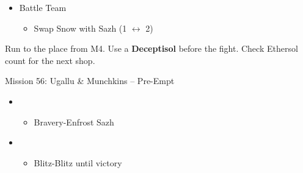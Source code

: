 \begin{menu}
	\begin{itemize}
	\paradigm
		\begin{itemize}
			\item Battle Team
				\begin{itemize}
					\item Swap Snow with Sazh (1 $\leftrightarrow$ 2)
				\end{itemize}
		\end{itemize}
	\end{itemize}
\end{menu}

Run to the place from M4.
Use a \textbf{Deceptisol} before the fight.
Check Ethersol count for the next shop.

\begin{battle}{Mission 56: Ugallu \& Munchkins -- Pre-Empt}
	\begin{itemize}
		\item \fourth
			\begin{itemize}
				\item Bravery-Enfrost Sazh
			\end{itemize}
		\item \first
			\begin{itemize}
				\item Blitz-Blitz until victory
			\end{itemize}
	\end{itemize}
\end{battle}

